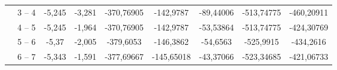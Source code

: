 \documentclass[a4paper,14pt]{article}
\begin{document}
\begin{landscape}
\begin{center}
\begin{longtable}{|c|c|c|c|c|c|c|c|c|}
                                             & 3 – 4                                & -5,245                                                                            & -3,281                                                                           & -370,76905                                                                                                       & -142,9787                                                                          & -89,44006                                                                          & -513,74775                    & -460,20911                    \\ \cline{2-9} 
                                             & 4 – 5                                & -5,245                                                                            & -1,964                                                                           & -370,76905                                                                                                       & -142,9787                                                                          & -53,53864                                                                          & -513,74775                    & -424,30769                    \\ \cline{2-9} 
                                             & 5 – 6                                & -5,37                                                                             & -2,005                                                                           & -379,6053                                                                                                        & -146,3862                                                                          & -54,6563                                                                           & -525,9915                     & -434,2616                     \\ \cline{2-9} 
                                             & 6 – 7                                & -5,343                                                                            & -1,591                                                                           & -377,69667                                                                                                       & -145,65018                                                                         & -43,37066                                                                          & -523,34685                    & -421,06733                    \\ \hline

\end{longtable}
\end{center}
\end{landscape}
\end{document}
